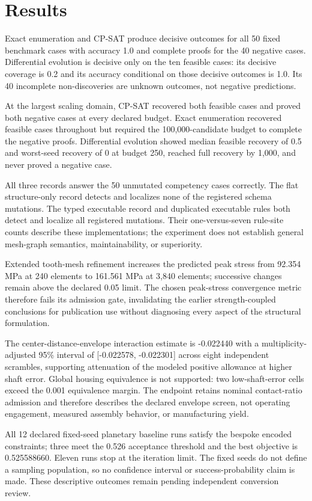 \documentclass[preprint,12pt]{elsarticle}
\begin{document}
\section{Results}
Exact enumeration and CP-SAT produce decisive outcomes for all 50 fixed benchmark cases with accuracy 1.0 and complete proofs for the 40 negative cases. Differential evolution is decisive only on the ten feasible cases: its decisive coverage is 0.2 and its accuracy conditional on those decisive outcomes is 1.0. Its 40 incomplete non-discoveries are unknown outcomes, not negative predictions.

At the largest scaling domain, CP-SAT recovered both feasible cases and proved both negative cases at every declared budget. Exact enumeration recovered feasible cases throughout but required the 100,000-candidate budget to complete the negative proofs. Differential evolution showed median feasible recovery of 0.5 and worst-seed recovery of 0 at budget 250, reached full recovery by 1,000, and never proved a negative case.

All three records answer the 50 unmutated competency cases correctly. The flat structure-only record detects and localizes none of the registered schema mutations. The typed executable record and duplicated executable rules both detect and localize all registered mutations. Their one-versus-seven rule-site counts describe these implementations; the experiment does not establish general mesh-graph semantics, maintainability, or superiority.

Extended tooth-mesh refinement increases the predicted peak stress from 92.354 MPa at 240 elements to 161.561 MPa at 3,840 elements; successive changes remain above the declared 0.05 limit. The chosen peak-stress convergence metric therefore fails its admission gate, invalidating the earlier strength-coupled conclusions for publication use without diagnosing every aspect of the structural formulation.

The center-distance-envelope interaction estimate is -0.022440 with a multiplicity-adjusted 95\% interval of [-0.022578, -0.022301] across eight independent scrambles, supporting attenuation of the modeled positive allowance at higher shaft error. Global housing equivalence is not supported: two low-shaft-error cells exceed the 0.001 equivalence margin. The endpoint retains nominal contact-ratio admission and therefore describes the declared envelope screen, not operating engagement, measured assembly behavior, or manufacturing yield.

All 12 declared fixed-seed planetary baseline runs satisfy the bespoke encoded constraints; three meet the 0.526 acceptance threshold and the best objective is 0.525588660. Eleven runs stop at the iteration limit. The fixed seeds do not define a sampling population, so no confidence interval or success-probability claim is made. These descriptive outcomes remain pending independent conversion review.
\end{document}
